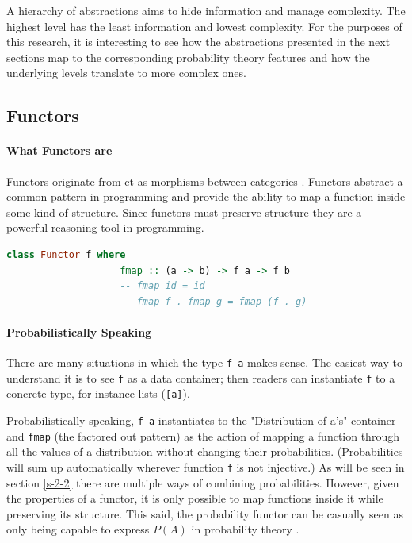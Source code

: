 \documentclass[
  oneside,
  11pt, a4paper,
  footinclude=true,
  headinclude=true,
  cleardoublepage=empty
]{scrbook}
\theoremstyle{definition}
\theoremstyle{definition}
\begin{document}
	A hierarchy of abstractions aims to hide information and manage complexity. The highest level has the least information and lowest complexity. For the purposes of this research, it is interesting to see how the abstractions presented in the next sections map to the corresponding probability theory features and how the underlying levels translate to more complex ones.
	
	    \subsection{Functors}
	    
	       \paragraph{What Functors are}
	        
	Functors originate from \gls{ct} as morphisms between categories \citep{Awodey:2010:CT:2060081}. Functors abstract a common pattern in programming and provide the ability to map a function inside some kind of structure. Since functors must preserve structure they are a powerful reasoning tool in programming.
	            
	            \begin{lstlisting}[mathescape, language=Haskell, caption={Functor laws},captionpos=b]
                class Functor f where
                    fmap :: (a -> b) -> f a -> f b
                    -- fmap id = id
                    -- fmap f . fmap g = fmap (f . g)
	            \end{lstlisting}{}
	            
	       \paragraph{Probabilistically Speaking}
	        
	There are many situations in which the type \texttt{f a} makes sense. The easiest way to understand it is to see \texttt{f} as a data container; then readers can instantiate \texttt{f} to a concrete type, for instance lists (\texttt{[a]}).
	           
	Probabilistically speaking, \texttt{f a} instantiates to the "Distribution of a's" container and \texttt{fmap} (the factored out pattern) as the action of mapping a function through all the values of a distribution without changing their probabilities. (Probabilities will sum up automatically wherever function \texttt{f} is not injective.) As will be seen in section \ref{s-2-2} there are multiple ways of combining probabilities. However, given the properties of a functor, it is only possible to map functions inside it while preserving its structure. This said, the probability functor can be casually seen as only being capable to express $P(A)$ in probability theory \citep{jtobin}.
	
\end{document}
